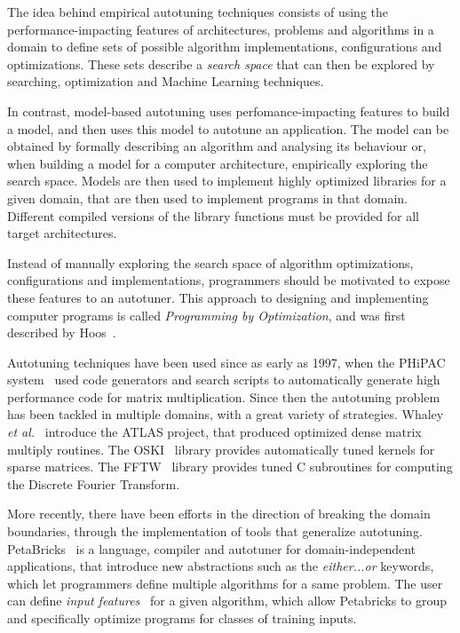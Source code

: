 \documentclass[a4paper, 12pt]{article}
\begin{document}
The idea behind empirical autotuning techniques consists of using the
performance-impacting features of architectures, problems and algorithms
in a domain to define sets of possible algorithm implementations,
configurations and optimizations. These sets describe a \emph{search space}
that can then be explored by searching, optimization and Machine Learning
techniques.

In contrast, model-based autotuning uses perfomance-impacting features
to build a model, and then uses this model to autotune an application.
The model can be obtained by formally describing an algorithm and analysing
its behaviour or, when building a model for a computer architecture,
empirically exploring the search space.
Models are then used to implement highly optimized libraries for a given
domain, that are then used to implement programs in that domain. Different
compiled versions of the library functions must be provided for all target
architectures.

Instead of manually exploring the search space of algorithm optimizations,
configurations and implementations, programmers should be motivated to expose
these features to an autotuner. This approach to designing and implementing
computer programs is called \emph{Programming by Optimization}, and was
first described by Hoos~\cite{hoos2012programming}.

Autotuning techniques have been used since as early as 1997, when the PHiPAC
system~\cite{bilmes1997phipac} used code generators and search scripts to
automatically generate high performance code for matrix multiplication. Since
then the autotuning problem has been tackled in multiple domains, with a great
variety of strategies. Whaley \emph{et al.}~\cite{whaley1998atlas} introduce the
ATLAS project, that produced optimized dense matrix multiply routines. The
OSKI~\cite{vuduc2005oski} library provides automatically tuned kernels for
sparse matrices. The FFTW~\cite{frigo1998fftw} library provides tuned C
subroutines for computing the Discrete Fourier Transform.

More recently, there have been efforts in the direction of breaking the domain
boundaries, through the implementation of tools that generalize autotuning.
PetaBricks~\cite{ansel2009petabricks} is a language, compiler and autotuner for
domain-independent applications, that introduce new abstractions such as the
\emph{either...or} keywords, which let programmers define multiple algorithms
for a same problem. The user can define \emph{input
features}~\cite{ding2014autotuning} for a given algorithm, which allow
Petabricks to group and specifically optimize programs for classes of
training inputs.
\end{document}
